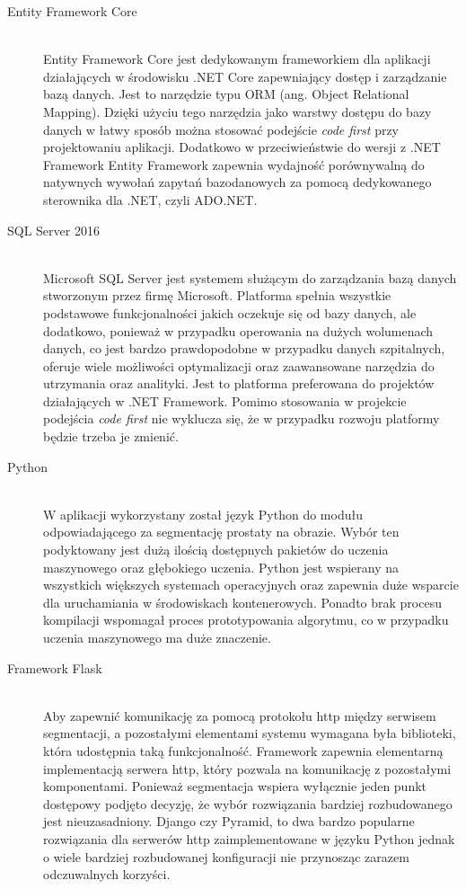 \documentclass[a4paper,11pt,twoside]{report}
\theoremstyle{definition}
\begin{document}
\begin{description}
\item [Entity Framework Core] \hfill \\
Entity Framework Core jest dedykowanym frameworkiem dla aplikacji działających w środowisku .NET Core zapewniający dostęp i zarządzanie bazą danych. Jest to narzędzie typu ORM (ang. Object Relational Mapping). Dzięki użyciu tego narzędzia jako warstwy dostępu do bazy danych w łatwy sposób można stosować podejście \textit{code first} przy projektowaniu aplikacji. Dodatkowo w przeciwieństwie do wersji z .NET Framework Entity Framework zapewnia wydajność porównywalną do natywnych wywołań zapytań bazodanowych za pomocą dedykowanego sterownika dla .NET, czyli ADO.NET.
\item [SQL Server 2016] \hfill \\
Microsoft SQL Server jest systemem służącym do zarządzania bazą danych stworzonym przez firmę Microsoft. Platforma spełnia wszystkie podstawowe funkcjonalności jakich oczekuje się od bazy danych, ale dodatkowo, ponieważ w przypadku operowania na dużych wolumenach danych, co jest bardzo prawdopodobne w przypadku danych szpitalnych, oferuje wiele możliwości optymalizacji oraz zaawansowane narzędzia do utrzymania oraz analityki. Jest to platforma preferowana do projektów działających w .NET Framework. Pomimo stosowania w projekcie podejścia \textit{code first} nie wyklucza się, że w przypadku rozwoju platformy będzie trzeba je zmienić.
\item [Python] \hfill \\
W aplikacji wykorzystany został język Python do modułu odpowiadającego za segmentację prostaty na obrazie. Wybór ten podyktowany jest dużą ilością dostępnych pakietów do uczenia maszynowego oraz głębokiego uczenia. Python jest wspierany na wszystkich większych systemach operacyjnych oraz zapewnia duże wsparcie dla uruchamiania w środowiskach kontenerowych. Ponadto brak procesu kompilacji wspomagał proces prototypowania algorytmu, co w przypadku uczenia maszynowego ma duże znaczenie. 
\item [Framework Flask ] \hfill \\
Aby zapewnić komunikację za pomocą protokołu http między serwisem segmentacji, a pozostałymi elementami systemu wymagana była biblioteki, która udostępnia taką funkcjonalność. Framework zapewnia elementarną implementacją serwera http, który pozwala na komunikację z pozostałymi komponentami. Ponieważ segmentacja wspiera wyłącznie jeden punkt dostępowy podjęto decyzję, że wybór rozwiązania bardziej rozbudowanego jest nieuzasadniony. Django czy Pyramid, to dwa bardzo popularne rozwiązania dla serwerów http zaimplementowane w języku Python jednak o wiele bardziej rozbudowanej konfiguracji nie przynosząc zarazem odczuwalnych korzyści.

\end{description}
\end{document}
